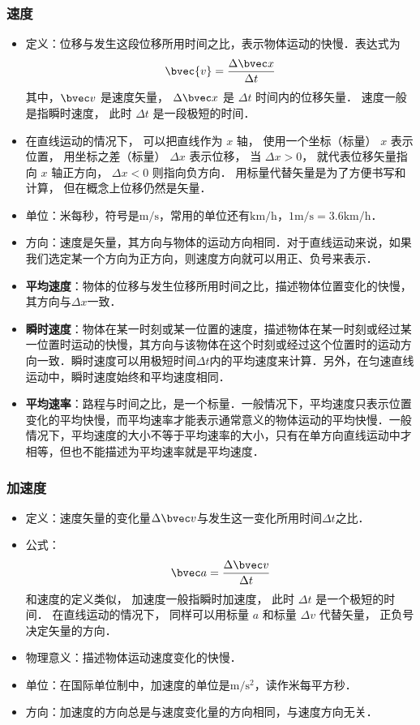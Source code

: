 \subsubsection{速度}
\begin{itemize}
\item 定义：位移与发生这段位移所用时间之比，表示物体运动的快慢．表达式为
\begin{equation}\label{HSPM01_eq3}
\bvec{v} = \frac{\Delta \bvec x}{\Delta t}
\end{equation}
其中，$\bvec v$ 是速度矢量， $\Delta \bvec x$ 是 $\Delta t$ 时间内的位移矢量． 速度一般是指瞬时速度， 此时 $\Delta t$ 是一段极短的时间．
\item 在直线运动的情况下， 可以把直线作为 $x$ 轴， 使用一个坐标（标量） $x$ 表示位置， 用坐标之差（标量） $\Delta x$ 表示位移， 当 $\Delta x > 0$， 就代表位移矢量指向 $x$ 轴正方向， $\Delta x < 0$ 则指向负方向． 用标量代替矢量是为了方便书写和计算， 但在概念上位移仍然是矢量．
\item 单位：米每秒，符号是$\mathrm{m/s}$，常用的单位还有$\mathrm{km/h}$，$1\mathrm{m/s}=3.6\mathrm{km/h}$．
\item 方向：速度是矢量，其方向与物体的运动方向相同．对于直线运动来说，如果我们选定某一个方向为正方向，则速度方向就可以用正、负号来表示．
\item \textbf{平均速度}：物体的位移与发生位移所用时间之比，描述物体位置变化的快慢，其方向与$\Delta x$一致．
\item \textbf{瞬时速度}：物体在某一时刻或某一位置的速度，描述物体在某一时刻或经过某一位置时运动的快慢，其方向与该物体在这个时刻或经过这个位置时的运动方向一致．瞬时速度可以用极短时间$\Delta t$内的平均速度来计算．另外，在匀速直线运动中，瞬时速度始终和平均速度相同．
\item \textbf{平均速率}：路程与时间之比，是一个标量．一般情况下，平均速度只表示位置变化的平均快慢，而平均速率才能表示通常意义的物体运动的平均快慢．一般情况下，平均速度的大小不等于平均速率的大小，只有在单方向直线运动中才相等，但也不能描述为平均速率就是平均速度．
\end{itemize}

\subsubsection{加速度}
\begin{itemize}
\item 定义：速度矢量的变化量$\Delta \bvec v$与发生这一变化所用时间$\Delta t$之比．
\item 公式：
\begin{equation}
\bvec a=\frac{\Delta \bvec v}{\Delta t}
\end{equation}
和速度的定义类似， 加速度一般指瞬时加速度， 此时 $\Delta t$ 是一个极短的时间． 在直线运动的情况下， 同样可以用标量 $a$ 和标量 $\Delta v$ 代替矢量， 正负号决定矢量的方向．
\item 物理意义：描述物体运动速度变化的快慢．
\item 单位：在国际单位制中，加速度的单位是$\mathrm{m/s^2}$，读作米每平方秒．
\item 方向：加速度的方向总是与速度变化量的方向相同，与速度方向无关．
\end{itemize}


